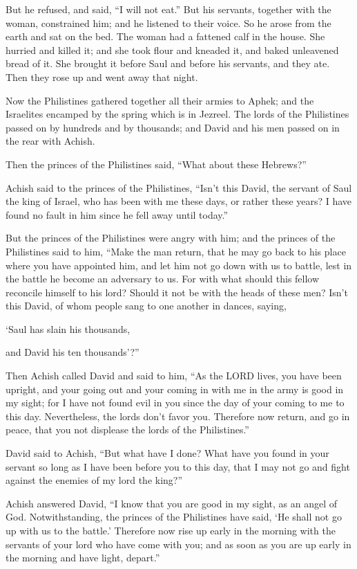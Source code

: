 \myverse{}But he refused, and said, “I will not eat.” But his servants,
together with the woman, constrained him; and he listened to their voice. So he arose from the earth and
sat on the bed.
\myverse{}The woman had a fattened calf in the house. She hurried and killed it; and
she took flour and kneaded it, and baked unleavened bread of it.
\myverse{}She brought it before Saul and before his servants, and they ate. Then they
rose up and went away that night.


\mychapter{} \myverse*{}Now the Philistines gathered together all their armies to Aphek;
and the Israelites encamped by the spring which is in Jezreel.
\myverse{}The lords of the Philistines passed on by hundreds and by thousands; and David
and his men passed on in the rear with Achish.

\myverse{}Then the princes of the Philistines said, “What about these Hebrews?”

Achish said to the princes of the Philistines, “Isn’t this David, the servant of Saul the
king of Israel, who has been with me these days, or rather these years? I have found no fault in him since
he fell away until today.”

\myverse{}But the princes of the Philistines were angry with him; and the
princes of the Philistines said to him, “Make the man return, that he may go back to his place where you
have appointed him, and let him not go down with us to battle, lest in the battle he become an adversary
to us. For with what should this fellow reconcile himself to his lord? Should it not be with the heads
of these men?
\myverse{}Isn’t this David, of whom people sang to one another in dances, saying,

‘Saul has slain his thousands,

and David his ten thousands’?”

\myverse{}Then Achish called David and said to him, “As the LORD lives,
you have been upright, and your going out and your coming in with me in the army is good in my sight;
for I have not found evil in you since the day of your coming to me to this day. Nevertheless, the lords
don’t favor you.
\myverse{}Therefore now return, and go in peace, that you not displease the lords of
the Philistines.”

\myverse{}David said to Achish, “But what have I done? What have you found
in your servant so long as I have been before you to this day, that I may not go and fight against the
enemies of my lord the king?”

\myverse{}Achish answered David, “I know that you are good in my sight,
as an angel of God. Notwithstanding, the princes of the Philistines have said, ‘He shall not go up with
us to the battle.’
\myverse{}Therefore now rise up early in the morning with the servants of your lord
who have come with you; and as soon as you are up early in the morning and have light, depart.”

